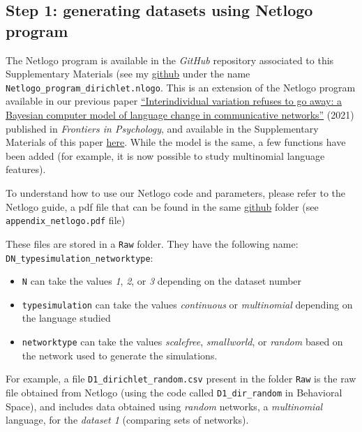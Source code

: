 \documentclass[
]{article}
\providecommand{\tightlist}{%
  \setlength{\itemsep}{0pt}\setlength{\parskip}{0pt}}
\begin{document}
\hypertarget{step-1-generating-datasets-using-netlogo-program}{%
\subsection{Step 1: generating datasets using Netlogo
program}\label{step-1-generating-datasets-using-netlogo-program}}

The Netlogo program is available in the \emph{GitHub} repository
associated to this Supplementary Materials (see my
\href{https://github.com/mathjoss/NetworkStructure_ABM}{github} under
the name \texttt{Netlogo\_program\_dirichlet.nlogo}. This is an
extension of the Netlogo program available in our previous paper
\href{https://www.frontiersin.org/journals/psychology/articles/10.3389/fpsyg.2021.626118/full}{``Interindividual
variation refuses to go away: a Bayesian computer model of language
change in communicative networks''} (2021) published in \emph{Frontiers
in Psychology}, and available in the Supplementary Materials of this
paper \href{https://github.com/mathjoss/bayes-in-network}{here}. While
the model is the same, a few functions have been added (for example, it
is now possible to study multinomial language features).

To understand how to use our Netlogo code and parameters, please refer
to the Netlogo guide, a pdf file that can be found in the same
\href{https://github.com/mathjoss/NetworkStructure_ABM}{github} folder
(see \texttt{appendix\_netlogo.pdf} file)

These files are stored in a \texttt{Raw} folder. They have the following
name: \texttt{DN\_typesimulation\_networktype}:

\begin{itemize}
\tightlist
\item
  \texttt{N} can take the values \emph{1}, \emph{2}, or \emph{3}
  depending on the dataset number
\item
  \texttt{typesimulation} can take the values \emph{continuous} or
  \emph{multinomial} depending on the language studied
\item
  \texttt{networktype} can take the values \emph{scalefree},
  \emph{smallworld}, or \emph{random} based on the network used to
  generate the simulations.
\end{itemize}

For example, a file \texttt{D1\_dirichlet\_random.csv} present in the
folder \texttt{Raw} is the raw file obtained from Netlogo (using the
code called \texttt{D1\_dir\_random} in Behavioral Space), and includes
data obtained using \emph{random} networks, a \emph{multinomial}
language, for the \emph{dataset 1} (comparing sets of networks).
\end{document}
